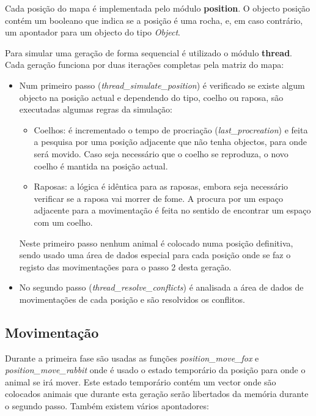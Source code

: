 \documentclass[12pt]{article}
\begin{document}
Cada posição do mapa é implementada pelo módulo \textbf{position}. O objecto posição contém
um booleano que indica se a posição é uma rocha, e, em caso contrário, um apontador para um objecto do tipo \textit{Object}.

Para simular uma geração de forma sequencial é utilizado o módulo \textbf{thread}. Cada geração
funciona por duas iterações completas pela matriz do mapa:

\begin{itemize}
  \item Num primeiro passo (\textit{thread\_simulate\_position}) é verificado se existe algum objecto
  na posição actual e dependendo do tipo, coelho ou raposa, são executadas algumas regras da simulação:
    \begin{itemize}
      \item Coelhos: é incrementado o tempo de procriação (\textit{last\_procreation}) e feita a pesquisa por uma posição
        adjacente que não tenha objectos, para onde será movido.
        Caso seja necessário que o coelho se reproduza, o novo coelho é mantida na posição
        actual.
      \item Raposas: a lógica é idêntica para as raposas, embora seja necessário verificar se a raposa vai morrer de fome.
       A procura por um espaço adjacente para a movimentação é feita no sentido de encontrar um espaço com um coelho.
    \end{itemize}
    Neste primeiro passo nenhum animal é colocado numa posição definitiva, sendo usado uma área de dados
    especial para cada posição onde se faz o registo das movimentações para o passo 2 desta geração.
  \item No segundo passo (\textit{thread\_resolve\_conflicts}) é analisada a área de dados de movimentações de cada posição e são resolvidos os conflitos.
\end{itemize}

\subsection{Movimentação}

Durante a primeira fase são usadas as funções \textit{position\_move\_fox} e \textit{position\_move\_rabbit}
onde é usado o estado temporário da posição para onde o animal se irá mover. Este estado temporário
contém um vector onde são colocados animais que durante esta geração serão libertados da memória durante
o segundo passo. Também existem vários apontadores:
\end{document}
